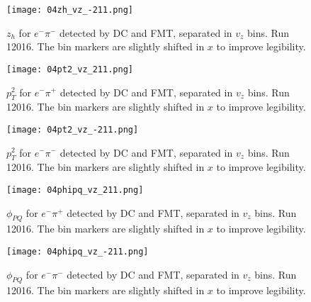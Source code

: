     \begin{figure}
        \centering
        \texttt{[image: 04zh\_vz\_-211.png]}
        \caption[$z_h$ for $e^-\pi^-$ separated in $v_z$ bins]
        {$z_h$ for $e^-\pi^-$ detected by DC and FMT, separated in $v_z$ bins.
        Run 12016.
        The bin markers are slightly shifted in $x$ to improve legibility.}
        \label{fig::20.04::zh_-211_vz}
    \end{figure}

    \begin{figure}
        \centering
        \texttt{[image: 04pt2\_vz\_211.png]}
        \caption[$p_T^2$ for $e^-\pi^+$ separated in $v_z$ bins]
        {$p_T^2$ for $e^-\pi^+$ detected by DC and FMT, separated in $v_z$ bins.
        Run 12016.
        The bin markers are slightly shifted in $x$ to improve legibility.}
        \label{fig::20.04::pt2_211_vz}
    \end{figure}

    \begin{figure}
        \centering
        \texttt{[image: 04pt2\_vz\_-211.png]}
        \caption[$p_T^2$ for $e^-\pi^-$ separated in $v_z$ bins]
        {$p_T^2$ for $e^-\pi^-$ detected by DC and FMT, separated in $v_z$ bins.
        Run 12016.
        The bin markers are slightly shifted in $x$ to improve legibility.}
        \label{fig::20.04::pt2_-211_vz}
    \end{figure}

    \begin{figure}
        \centering
        \texttt{[image: 04phipq\_vz\_211.png]}
        \caption[$\phi_{PQ}$ for $e^-\pi^+$ separated in $v_z$ bins]
        {$\phi_{PQ}$ for $e^-\pi^+$ detected by DC and FMT, separated in $v_z$ bins.
        Run 12016.
        The bin markers are slightly shifted in $x$ to improve legibility.}
        \label{fig::20.04::phipq_211_vz}
    \end{figure}

    \begin{figure}
        \centering
        \texttt{[image: 04phipq\_vz\_-211.png]}
        \caption[$\phi_{PQ}$ for $e^-\pi^-$ separated in $v_z$ bins]
        {$\phi_{PQ}$ for $e^-\pi^-$ detected by DC and FMT, separated in $v_z$ bins.
        Run 12016.
        The bin markers are slightly shifted in $x$ to improve legibility.}
        \label{fig::20.04::phipq_-211_vz}
    \end{figure}

